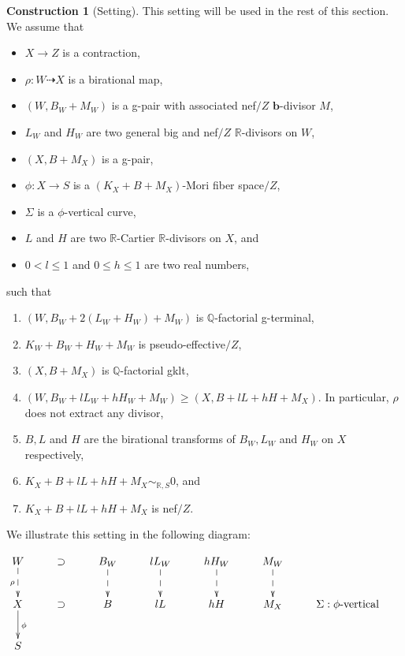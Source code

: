 \documentclass[11pt]{amsart}
\numberwithin{equation}{section}
\newcommand{\bb}{\bm{b}}
\newcommand{\Qq}{\mathbb{Q}}
\newcommand{\Rr}{\mathbb{R}}
\theoremstyle{definition}
\newtheorem{cons}[thm]{Construction}
\theoremstyle{remark}
\theoremstyle{definition}
\begin{document}
\begin{cons}[Setting]\label{cons: setting for sarkisov link}
This setting will be used in the rest of this section. We assume that
\begin{itemize}
    \item $X\rightarrow Z$ is a contraction,
    \item $\rho: W\dashrightarrow X$ is a birational map,
    \item $(W,B_W+M_W)$ is a g-pair with associated nef$/Z$ $\bb$-divisor $M$,
    \item $L_W$ and $H_W$ are two general big and nef$/Z$ $\Rr$-divisors on $W$, 
    \item $(X,B+M_X)$ is a g-pair, 
    \item $\phi: X\rightarrow S$ is a $(K_X+B+M_X)$-Mori fiber space$/Z$,
    \item $\Sigma$ is a $\phi$-vertical curve,
    \item $L$ and $H$ are two $\Rr$-Cartier $\Rr$-divisors on $X$, and
    \item $0<l\leq 1$ and $0\leq h\leq 1$ are two real numbers,
\end{itemize} 
such that
\begin{enumerate}
    \item $(W,B_W+2(L_W+H_W)+M_W)$ is $\Qq$-factorial g-terminal,
    \item $K_W+B_W+H_W+M_W$ is pseudo-effective$/Z$,
    \item $(X,B+M_X)$ is $\Qq$-factorial gklt,
    \item $(W,B_W+lL_W+hH_W+M_W)\geq (X,B+lL+hH+M_X)$. In particular, $\rho$ does not extract any divisor,
    \item $B,L$ and $H$ are the birational transforms of $B_W,L_W$ and $H_W$ on $X$ respectively,
    \item $K_X+B+lL+hH+M_X\sim_{\mathbb R,S}0$, and
    \item $K_X+B+lL+hH+M_X$ is nef$/Z$.
\end{enumerate}
We illustrate this setting in the following diagram:
\medskip

\begin{center}$\xymatrix{
  W\ar@{-->}[d]_{\rho}&\supset & B_W\ar@{-->}[d] &lL_W\ar@{-->}[d] &hH_W\ar@{-->}[d] &M_W\ar@{-->}[d] &\\
      X \ar@{->}[d]^{\phi}&\supset & B &lL &hH &M_X  &\Sigma:\phi\text{-vertical}    \\
    S & }$
\end{center}
\end{cons}
\end{document}
